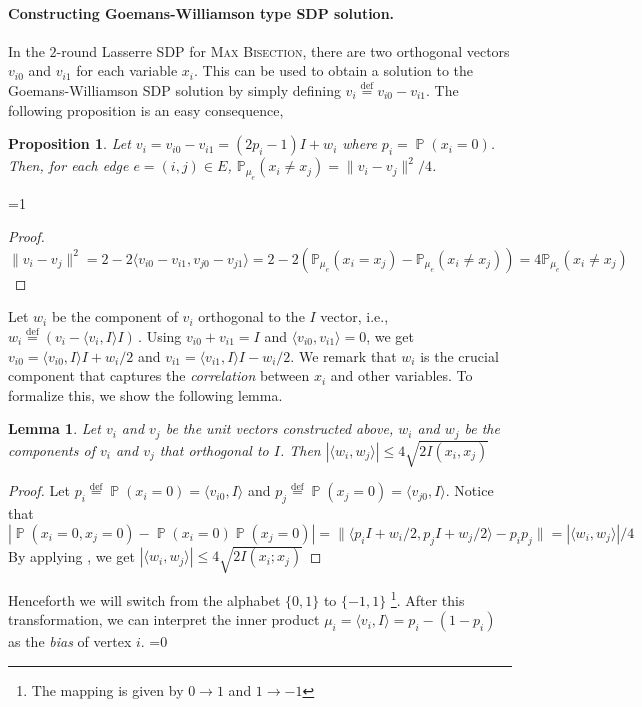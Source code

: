 \documentclass[11pt]{article}
\def\full{1}
\newtheorem{proposition}[theorem]{Proposition}
\newtheorem{lemma}[theorem]{Lemma}
\theoremstyle{definition}
\newcommand{\iprod}[1]{\langle#1\rangle}
\newcommand{\Psymb}{\mathbb{P}}
\DeclareMathOperator*{\ProbOp}{\Psymb}
\renewcommand{\Pr}{\ProbOp}
\newcommand{\defeq}{\stackrel{\mathrm{def}}=}
\newcommand{\mper}{\,.}
\newcommand{\problemmacro}[1]{\texorpdfstring{\textsc{#1}}{#1}\xspace}
\newcommand{\maxbisection}{\problemmacro{Max Bisection}}
\renewcommand{\leq}{\leqslant}
\numberwithin{equation}{section}
\let\origparagraph\paragraph
\renewcommand{\paragraph}[1]{\origparagraph{#1.}}
\let\pref=\prettyref
\begin{document}
\paragraph{Constructing Goemans-Williamson type SDP solution}
In the $2$-round Lasserre SDP for \maxbisection, there are two orthogonal vectors
$v_{i0}$ and $v_{i1}$ for each variable $x_i$.  This can be used to
obtain a solution to the Goemans-Williamson SDP solution by simply defining $v_i
\defeq v_{i0} - v_{i1}$.  The following proposition is an easy consequence,
\begin{proposition}
Let $v_i=v_{i0}-v_{i1}=(2p_i-1)I+w_i$ where $p_i=\Pr(x_i=0)$. Then, for each edge $e=(i,j)\in E$, $\mathbb{P}_{\mu_e}(x_i\neq x_j)=\|v_i-v_j\|^2/4$.
\end{proposition}
\ifnum\full=1
\begin{proof}
$$
\|v_i-v_j\|^2=2-2\langle v_{i0}-v_{i1},v_{j0}-v_{j1} \rangle = 2-2(\mathbb{P}_{\mu_e}(x_i=x_j)-\mathbb{P}_{\mu_e}(x_i\neq x_j))=4\mathbb{P}_{\mu_e}(x_i\neq x_j)
$$
\end{proof}
\fi
Let $w_i$ be the component of $v_{i}$ orthogonal to the $I$ vector, i.e.,
$ w_i \defeq (v_{i} - \iprod{v_{i},I}I) \mper $
Using $v_{i0} + v_{i1} = I$ and $\iprod{v_{i0},v_{i1}} = 0$, we get $v_{i0} = \iprod{v_{i0},I} I +
w_i/2$ and $v_{i1} = \iprod{v_{i1},I} I - w_i/2$.
We remark that $w_i$ is the crucial component that captures the \emph{correlation} between $x_i$ and other variables. To formalize this, we show the following lemma.
\begin{lemma} \label{lem:ipbound}
Let $v_i$ and $v_j$ be the unit vectors constructed above, $w_i$ and $w_j$ be the components of $v_i$ and $v_j$ that orthogonal to $I$. Then
$
|\langle w_i, w_j \rangle|\leq 4\sqrt{2I(x_i,x_j)}
$
\end{lemma}
\begin{proof}  Let $p_i \defeq \Pr(x_i = 0) = \iprod{v_{i0},I}$ and
$p_j \defeq \Pr(x_j = 0) = \iprod{v_{j0},I}$.  Notice that
$$
|\Pr(x_i=0, x_j=0)-\Pr(x_i=0)\Pr(x_j=0)|=\|\langle p_i I+w_i/2, p_j I+w_j/2 \rangle - p_i p_j\|= |\langle w_i,w_j \rangle|/4
$$
By applying \pref{fact:statdist}, we get
$
|\langle w_i,w_j \rangle|\leq 4\sqrt{2I(x_i;x_j)}
$
\end{proof}
Henceforth we will switch from the alphabet  $\{0,1\}$ to $\{-1,1\}$
\footnote{The mapping is given by $0 \rightarrow 1$ and $1 \rightarrow
-1$}. After this transformation, we can interpret the inner product $\mu_i=\langle v_i,I\rangle=p_i-(1-p_i)$ as the \emph{bias} of vertex $i$.
\ifnum\full=0 \vspace{-8pt}\fi
\end{document}
